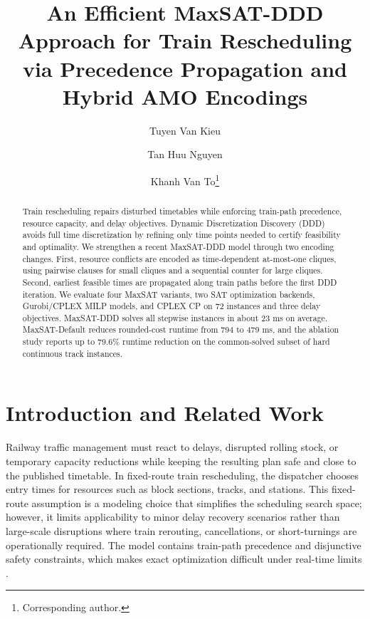\documentclass[runningheads]{llncs}
\begin{document}
\raggedbottom

\title{An Efficient MaxSAT-DDD Approach for Train Rescheduling via Precedence Propagation and Hybrid AMO Encodings}

\author{Tuyen Van Kieu \and
Tan Huu Nguyen \and
Khanh Van To\thanks{Corresponding author.}}

\maketitle

\begin{abstract}
Train rescheduling repairs disturbed timetables while enforcing train-path
precedence, resource capacity, and delay objectives. Dynamic Discretization
Discovery (DDD) avoids full time discretization by refining only time points
needed to certify feasibility and optimality. We strengthen a recent
MaxSAT-DDD model through two encoding changes. First, resource conflicts are
encoded as time-dependent at-most-one cliques, using pairwise clauses for small
cliques and a sequential counter for large cliques. Second, earliest feasible
times are propagated along train paths before the first DDD iteration. We
evaluate four MaxSAT variants, two SAT optimization backends, Gurobi/CPLEX
MILP models, and CPLEX CP on 72 instances and three delay objectives.
MaxSAT-DDD solves all stepwise instances in about 23 ms on average.
MaxSAT-Default reduces rounded-cost runtime from 794 to 479 ms, and the
ablation study reports up to 79.6\% runtime reduction on the common-solved subset of hard continuous track
instances.

\end{abstract}

\section{Introduction and Related Work}

Railway traffic management must react to delays, disrupted rolling stock, or
temporary capacity reductions while keeping the resulting plan safe and close to
the published timetable. In fixed-route train rescheduling, the dispatcher
chooses entry times for resources such as block sections, tracks, and stations.
This fixed-route assumption is a modeling choice that simplifies the scheduling search space; however, it limits applicability to minor delay recovery scenarios rather than large-scale disruptions where train rerouting, cancellations, or short-turnings are operationally required.
The model contains train-path precedence and disjunctive safety constraints,
which makes exact optimization difficult under real-time limits
\cite{FangYao2015,Cacchiani2014,Lamorgese2018}.
\end{document}
